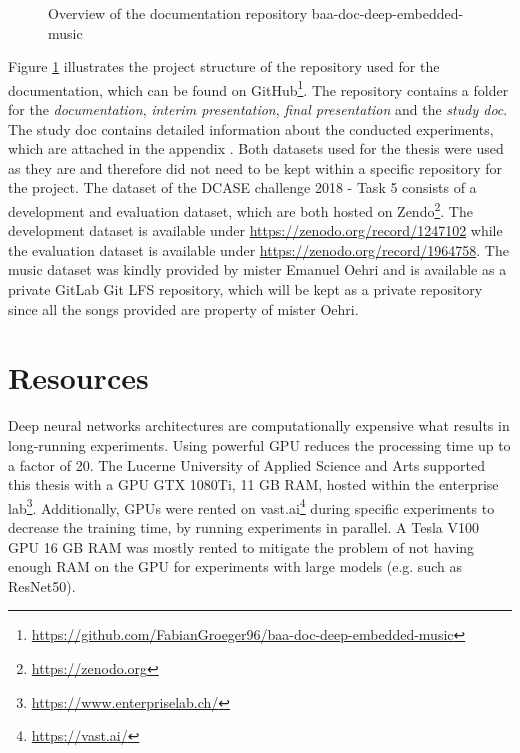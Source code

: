 \begin{figure}[ht]
\caption{Overview of the documentation repository \flqq baa-doc-deep-embedded-music\frqq}
\label{fig:Project-Overview-Documentation}
\end{figure}
\noindent
Figure \ref{fig:Project-Overview-Documentation} illustrates the project structure of the repository used for the documentation, which can be found on GitHub\footnote{\url{https://github.com/FabianGroeger96/baa-doc-deep-embedded-music}}. The repository contains a folder for the \textit{documentation}, \textit{interim presentation}, \textit{final presentation} and the \textit{study doc}. The study doc contains detailed information about the conducted experiments, which are attached in the appendix .
\newline
\newline
Both datasets used for the thesis were used as they are and therefore did not need to be kept within a specific repository for the project. The dataset of the DCASE challenge 2018 - Task 5 consists of a development and evaluation dataset, which are both hosted on Zendo\footnote{\url{https://zenodo.org}}. The development dataset is available under \url{https://zenodo.org/record/1247102} while the evaluation dataset is available under \url{https://zenodo.org/record/1964758}. 
\newline
\newline
The music dataset was kindly provided by mister Emanuel Oehri and is available as a private GitLab Git LFS repository, which will be kept as a private repository since all the songs provided are property of mister Oehri.

\section{Resources}
\label{sec:Resources}
Deep neural networks architectures are computationally expensive what results in long-running experiments. Using powerful \gls{GPU} reduces the processing time up to a factor of 20. The Lucerne University of Applied Science and Arts supported this thesis with a GPU GTX 1080Ti, 11 GB RAM, hosted within the enterprise lab\footnote{\url{https://www.enterpriselab.ch/}}. 
\newline
\newline
Additionally, \gls{GPU}s were rented on vast.ai\footnote{\url{https://vast.ai/}} during specific experiments to decrease the training time, by running experiments in parallel. A Tesla V100 \gls{GPU} 16 GB RAM was mostly rented to mitigate the problem of not having enough RAM on the GPU for experiments with large models (e.g. such as ResNet50).

